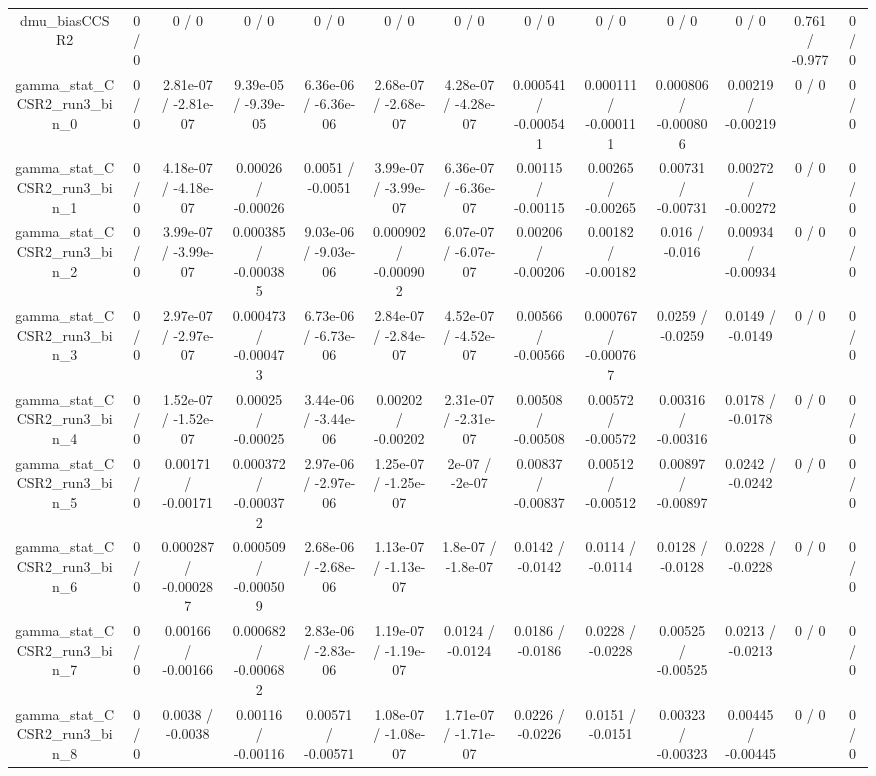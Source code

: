 \documentclass[10pt]{article}
\begin{document}
\begin{table}[htbp]
\begin{center}
\begin{tabular}{|c|c|c|c|c|c|c|c|c|c|c|c|c|}
  dmu_biasCCSR2 & 0 / 0 & 0 / 0 & 0 / 0 & 0 / 0 & 0 / 0 & 0 / 0 & 0 / 0 & 0 / 0 & 0 / 0 & 0 / 0 & 0.761 / -0.977 & 0 / 0 \\ 
  gamma_stat_CCSR2_run3_bin_0 & 0 / 0 & 2.81e-07 / -2.81e-07 & 9.39e-05 / -9.39e-05 & 6.36e-06 / -6.36e-06 & 2.68e-07 / -2.68e-07 & 4.28e-07 / -4.28e-07 & 0.000541 / -0.000541 & 0.000111 / -0.000111 & 0.000806 / -0.000806 & 0.00219 / -0.00219 & 0 / 0 & 0 / 0 \\ 
  gamma_stat_CCSR2_run3_bin_1 & 0 / 0 & 4.18e-07 / -4.18e-07 & 0.00026 / -0.00026 & 0.0051 / -0.0051 & 3.99e-07 / -3.99e-07 & 6.36e-07 / -6.36e-07 & 0.00115 / -0.00115 & 0.00265 / -0.00265 & 0.00731 / -0.00731 & 0.00272 / -0.00272 & 0 / 0 & 0 / 0 \\ 
  gamma_stat_CCSR2_run3_bin_2 & 0 / 0 & 3.99e-07 / -3.99e-07 & 0.000385 / -0.000385 & 9.03e-06 / -9.03e-06 & 0.000902 / -0.000902 & 6.07e-07 / -6.07e-07 & 0.00206 / -0.00206 & 0.00182 / -0.00182 & 0.016 / -0.016 & 0.00934 / -0.00934 & 0 / 0 & 0 / 0 \\ 
  gamma_stat_CCSR2_run3_bin_3 & 0 / 0 & 2.97e-07 / -2.97e-07 & 0.000473 / -0.000473 & 6.73e-06 / -6.73e-06 & 2.84e-07 / -2.84e-07 & 4.52e-07 / -4.52e-07 & 0.00566 / -0.00566 & 0.000767 / -0.000767 & 0.0259 / -0.0259 & 0.0149 / -0.0149 & 0 / 0 & 0 / 0 \\ 
  gamma_stat_CCSR2_run3_bin_4 & 0 / 0 & 1.52e-07 / -1.52e-07 & 0.00025 / -0.00025 & 3.44e-06 / -3.44e-06 & 0.00202 / -0.00202 & 2.31e-07 / -2.31e-07 & 0.00508 / -0.00508 & 0.00572 / -0.00572 & 0.00316 / -0.00316 & 0.0178 / -0.0178 & 0 / 0 & 0 / 0 \\ 
  gamma_stat_CCSR2_run3_bin_5 & 0 / 0 & 0.00171 / -0.00171 & 0.000372 / -0.000372 & 2.97e-06 / -2.97e-06 & 1.25e-07 / -1.25e-07 & 2e-07 / -2e-07 & 0.00837 / -0.00837 & 0.00512 / -0.00512 & 0.00897 / -0.00897 & 0.0242 / -0.0242 & 0 / 0 & 0 / 0 \\ 
  gamma_stat_CCSR2_run3_bin_6 & 0 / 0 & 0.000287 / -0.000287 & 0.000509 / -0.000509 & 2.68e-06 / -2.68e-06 & 1.13e-07 / -1.13e-07 & 1.8e-07 / -1.8e-07 & 0.0142 / -0.0142 & 0.0114 / -0.0114 & 0.0128 / -0.0128 & 0.0228 / -0.0228 & 0 / 0 & 0 / 0 \\ 
  gamma_stat_CCSR2_run3_bin_7 & 0 / 0 & 0.00166 / -0.00166 & 0.000682 / -0.000682 & 2.83e-06 / -2.83e-06 & 1.19e-07 / -1.19e-07 & 0.0124 / -0.0124 & 0.0186 / -0.0186 & 0.0228 / -0.0228 & 0.00525 / -0.00525 & 0.0213 / -0.0213 & 0 / 0 & 0 / 0 \\ 
  gamma_stat_CCSR2_run3_bin_8 & 0 / 0 & 0.0038 / -0.0038 & 0.00116 / -0.00116 & 0.00571 / -0.00571 & 1.08e-07 / -1.08e-07 & 1.71e-07 / -1.71e-07 & 0.0226 / -0.0226 & 0.0151 / -0.0151 & 0.00323 / -0.00323 & 0.00445 / -0.00445 & 0 / 0 & 0 / 0 \\ 

\end{tabular}
\end{center}
\end{table}
\end{document}
